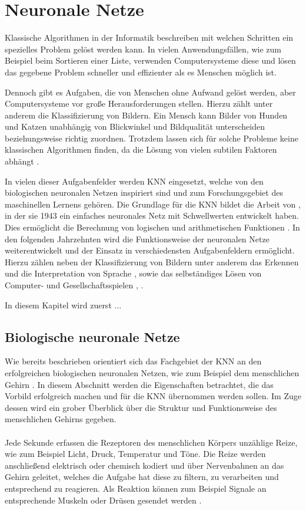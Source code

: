 \section{Neuronale Netze}
Klassische Algorithmen in der Informatik beschreiben mit welchen Schritten ein spezielles Problem gelöst werden kann. In vielen Anwendungsfällen, wie zum Beispiel beim Sortieren einer Liste, verwenden Computersysteme diese und lösen das gegebene Problem schneller und effizienter als es Menschen möglich ist. 

Dennoch gibt es Aufgaben, die von Menschen ohne Aufwand gelöst werden, aber Computersysteme vor große Herausforderungen stellen. Hierzu zählt unter anderem die Klassifizierung von Bildern. Ein Mensch kann Bilder von Hunden und Katzen unabhängig von Blickwinkel und Bildqualität unterscheiden beziehungsweise richtig zuordnen. Trotzdem lassen sich für solche Probleme keine klassischen Algorithmen finden, da die Lösung von vielen subtilen Faktoren abhängt \cite{kriesel2008kleiner}.

In vielen dieser Aufgabenfelder werden \ac{KNN} eingesetzt, welche von den biologischen neuronalen Netzen inspiriert sind und zum Forschungsgebiet des maschinellen Lernens gehören. Die Grundlage für die \ac{KNN} bildet die Arbeit von \citeauthor{mcculloch1943logical}, in der sie 1943 ein einfaches neuronales Netz mit Schwellwerten entwickelt haben. Dies ermöglicht die Berechnung von logischen und arithmetischen Funktionen \cite{mcculloch1943logical}. In den folgenden Jahrzehnten wird die Funktionsweise der neuronalen Netze weiterentwickelt und der Einsatz in verschiedensten Aufgabenfeldern ermöglicht. Hierzu zählen neben der Klassifizierung von Bildern \cite{krizhevsky2012imagenet} unter anderem das Erkennen und die Interpretation von Sprache \cite{hinton2012deep}, \cite{andor2016globally} sowie das selbständiges Lösen von Computer- und Gesellschaftsspielen \cite{mnih2013playing}, \cite{silver2016mastering}. 

In diesem Kapitel wird zuerst ...
\subsection{Biologische neuronale Netze}
Wie bereits beschrieben orientiert sich das Fachgebiet der \ac{KNN} an den erfolgreichen biologischen neuronalen Netzen, wie zum Beispiel dem menschlichen Gehirn \cite{kriesel2008kleiner}. In diesem Abschnitt werden die Eigenschaften betrachtet, die das Vorbild erfolgreich machen und für die \ac{KNN} übernommen werden sollen. Im Zuge dessen wird ein grober Überblick über die Struktur und Funktionsweise des menschlichen Gehirns gegeben. 
\\\\
Jede Sekunde erfassen die Rezeptoren des menschlichen Körpers unzählige Reize, wie zum Beispiel Licht, Druck, Temperatur und Töne. Die Reize werden anschließend elektrisch oder chemisch kodiert und über Nervenbahnen an das Gehirn geleitet, welches die Aufgabe hat diese zu filtern, zu verarbeiten und entsprechend zu reagieren. Als Reaktion können zum Beispiel Signale an entsprechende Muskeln oder Drüsen gesendet werden \cite{kinnebrock2018neuronale}. 

